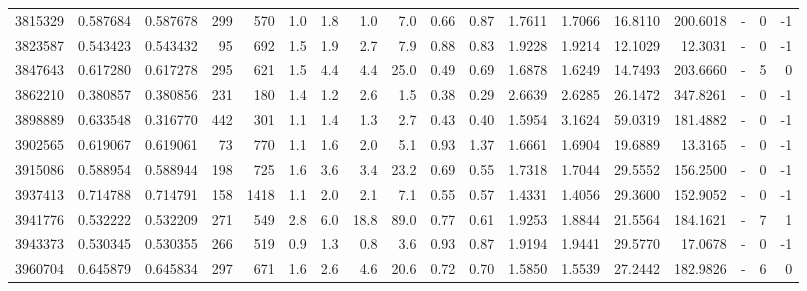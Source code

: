 \begin{tabular}{rrrrrrrrrrrrrrrlrr}
   3815329 & 0.587684 &   0.587678 &  299 &  570 &      1.0 &      1.8 &     1.0 &      7.0 &       0.66 &        0.87 &  1.7611 &  1.7066 &   16.8110 &  200.6018 &             - &        0 &         -1 \\
   3823587 & 0.543423 &   0.543432 &   95 &  692 &      1.5 &      1.9 &     2.7 &      7.9 &       0.88 &        0.83 &  1.9228 &  1.9214 &   12.1029 &   12.3031 &             - &        0 &         -1 \\
   3847643 & 0.617280 &   0.617278 &  295 &  621 &      1.5 &      4.4 &     4.4 &     25.0 &       0.49 &        0.69 &  1.6878 &  1.6249 &   14.7493 &  203.6660 &             - &        5 &          0 \\
   3862210 & 0.380857 &   0.380856 &  231 &  180 &      1.4 &      1.2 &     2.6 &      1.5 &       0.38 &        0.29 &  2.6639 &  2.6285 &   26.1472 &  347.8261 &             - &        0 &         -1 \\
   3898889 & 0.633548 &   0.316770 &  442 &  301 &      1.1 &      1.4 &     1.3 &      2.7 &       0.43 &        0.40 &  1.5954 &  3.1624 &   59.0319 &  181.4882 &             - &        0 &         -1 \\
   3902565 & 0.619067 &   0.619061 &   73 &  770 &      1.1 &      1.6 &     2.0 &      5.1 &       0.93 &        1.37 &  1.6661 &  1.6904 &   19.6889 &   13.3165 &             - &        0 &         -1 \\
   3915086 & 0.588954 &   0.588944 &  198 &  725 &      1.6 &      3.6 &     3.4 &     23.2 &       0.69 &        0.55 &  1.7318 &  1.7044 &   29.5552 &  156.2500 &             - &        0 &         -1 \\
   3937413 & 0.714788 &   0.714791 &  158 & 1418 &      1.1 &      2.0 &     2.1 &      7.1 &       0.55 &        0.57 &  1.4331 &  1.4056 &   29.3600 &  152.9052 &             - &        0 &         -1 \\
   3941776 & 0.532222 &   0.532209 &  271 &  549 &      2.8 &      6.0 &    18.8 &     89.0 &       0.77 &        0.61 &  1.9253 &  1.8844 &   21.5564 &  184.1621 &             - &        7 &          1 \\
   3943373 & 0.530345 &   0.530355 &  266 &  519 &      0.9 &      1.3 &     0.8 &      3.6 &       0.93 &        0.87 &  1.9194 &  1.9441 &   29.5770 &   17.0678 &             - &        0 &         -1 \\
   3960704 & 0.645879 &   0.645834 &  297 &  671 &      1.6 &      2.6 &     4.6 &     20.6 &       0.72 &        0.70 &  1.5850 &  1.5539 &   27.2442 &  182.9826 &             - &        6 &          0 \\

\end{tabular}
